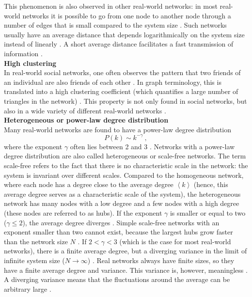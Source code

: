 \documentclass[11 pt , letterpaper , twoside , openright]{book}
\begin{document}
\newline
This phenomenon is also observed in other real-world networks: in most real-world networks it is possible to go from one node to another node through a number of edges that is small compared to the system size \cite{RealWorld}. Such networks usually have an average distance that depends logarithmically on the system size instead of linearly \cite{Newman2003}. A short average distance facilitates a fast transmission of information \cite{Newman2003}\cite{Zhang2014}.\\
\newline
\textbf{High clustering}\\
\newline
In real-world social networks, one often observes the pattern that two friends of an individual are also friends of each other \cite{RealWorld}. In graph terminology, this is translated into a high clustering coefficient (which quantifies a large number of triangles in the network) \cite{RealWorld}. This property is not only found in social networks, but also in a wide variety of different real-world networks \cite{RealWorld}.\\
\newline
\textbf{Heterogeneous or power-law degree distribution}\\
\newline
Many real-world networks are found to have a power-law degree distribution
\begin{equation}
	P(k) \sim k^{-\gamma} \ ,
\end{equation}
where the exponent $\gamma$ often lies between 2 and 3 \cite{RealWorld}. Networks with a power-law degree distribution are also called heterogeneous or scale-free networks. The term scale-free refers to the fact that there is no characteristic scale in the network: the system is invariant over different scales. Compared to the homogeneous network, where each node has a degree close to the average degree $\left<k\right>$ (hence, this average degree serves as a characteristic scale of the system), the heterogeneous network has many nodes with a low degree and a few nodes with a high degree (these nodes are referred to as hubs). If the exponent $\gamma$ is smaller or equal to two ($\gamma \leqslant 2$), the average degree diverges \cite{Newman2005}. Simple scale-free networks with an exponent smaller than two cannot exist, because the largest hubs grow faster than the network size $N$ \cite{Barabasi2016}. If $2 < \gamma < 3$ (which is the case for most real-world networks), there is a finite average degree, but a diverging variance in the limit of infinite system size ($N \rightarrow \infty$) \cite{Newman2005}. Real networks always have finite sizes, so they have a finite average degree and variance. This variance is, however, meaningless \cite{Newman2005}. A diverging variance means that the fluctuations around the average can be arbitrary large \cite{Barabasi2016}.\\
\end{document}
